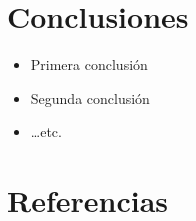 \documentclass[11pt,letterpaper]{article}
\begin{document}
\section{Conclusiones\label{sec:conclusions}}


\begin{itemize}
\item Primera conclusión
\item Segunda conclusión
\item \ldots etc.
\end{itemize}

\section{Referencias\label{sec:references}}


\printbibliography[heading=none]
		
\end{document}
